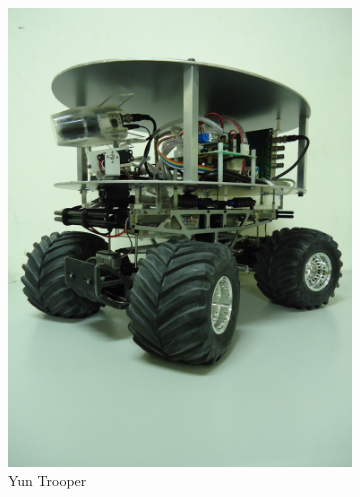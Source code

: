 \begin{figure}[h!]
	\centering
	\begin{subfigure}[b]{0.45\textwidth}
		\includegraphics[width=\textwidth]{figures/YunTrooper.jpg}
		\caption{Yun Trooper}
		\label{fig:YunTrooperI}
	\end{subfigure}
	\begin{subfigure}[b]{0.45\textwidth}

\end{subfigure}
\end{figure}
